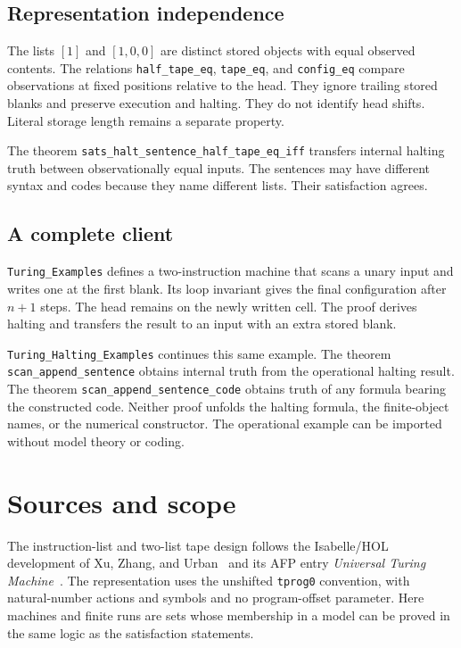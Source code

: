 \documentclass[11pt,a4paper]{article}
\newcommand{\theoremname}[1]{{\urlstyle{tt}\nolinkurl{#1}}}
\begin{document}
\subsection{Representation independence}
The lists $[1]$ and $[1,0,0]$ are distinct stored objects with equal
observed contents. The relations \theoremname{half_tape_eq},
\theoremname{tape_eq}, and \theoremname{config_eq} compare observations
at fixed positions relative to the head. They ignore trailing stored
blanks and preserve execution and halting. They do not identify head
shifts. Literal storage length remains a separate property.

The theorem \theoremname{sats_halt_sentence_half_tape_eq_iff} transfers
internal halting truth between observationally equal inputs. The
sentences may have different syntax and codes because they name
different lists. Their satisfaction agrees.

\subsection{A complete client}
\theoremname{Turing_Examples} defines a two-instruction machine that
scans a unary input and writes one at the first blank. Its loop invariant
gives the final configuration after $n+1$ steps. The head remains on
the newly written cell. The proof derives halting and transfers the
result to an input with an extra stored blank.

\theoremname{Turing_Halting_Examples} continues this same example.
The theorem \theoremname{scan_append_sentence} obtains internal truth
from the operational halting result.
The theorem \theoremname{scan_append_sentence_code} obtains truth of
any formula bearing the constructed code. Neither proof unfolds the
halting formula, the finite-object names, or the numerical constructor.
The operational example can be imported without model theory or coding.

\section{Sources and scope}
The instruction-list and two-list tape design follows the Isabelle/HOL
development of Xu, Zhang, and Urban~\cite{xu-zhang-urban} and its AFP
entry \emph{Universal Turing Machine}~\cite{afp-utm}. The representation
uses the unshifted \texttt{tprog0} convention, with natural-number
actions and symbols and no program-offset parameter.
Here machines and finite runs are sets whose membership in a model
can be proved in the same logic as the satisfaction statements.
\end{document}
